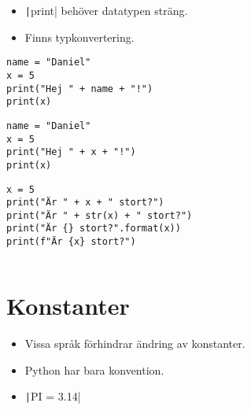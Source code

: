 \begin{frame}[fragile]
  \begin{remark}
    \begin{itemize}
      \item \texttt|print| behöver datatypen sträng.
      \item Finns typkonvertering.
    \end{itemize}
  \end{remark}

  \begin{example}[Funkar]
    \begin{verbatim}
name = "Daniel"
x = 5
print("Hej " + name + "!")
print(x)
    \end{verbatim}
  \end{example}

  \begin{example}
    \begin{verbatim}
name = "Daniel"
x = 5
print("Hej " + x + "!")
print(x)
    \end{verbatim}
  \end{example}
\end{frame}

\begin{frame}[fragile]
  \begin{example}
    \begin{verbatim}
x = 5
print("Är " + x + " stort?")
print("Är " + str(x) + " stort?")
print("Är {} stort?".format(x))
print(f"Är {x} stort?")
    \end{verbatim}
  \end{example}
\end{frame}

\begin{frame}[fragile]
  \inputminted[highlightlines={14,20,27-28},linenos,firstline=11]{python}{examples/age.py}
\end{frame}


\section{Konstanter}

\begin{frame}
  \begin{remark}
    \begin{itemize}
      \item Vissa språk förhindrar ändring av konstanter.
      \item Python har bara konvention.
      \item \texttt|PI = 3.14|
    \end{itemize}
  \end{remark}
\end{frame}



